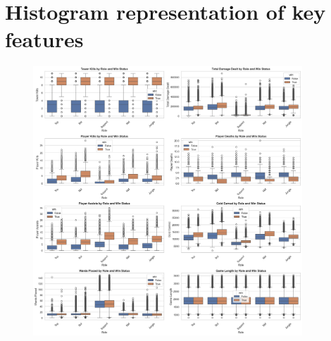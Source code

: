 \documentclass[12pt, a4paper]{article}
\begin{document}
\clearpage
\appendix
\section{Histogram representation of key features}\label{sec:features_histogram}
\begin{figure}[!ht]
    \centering
    \includegraphics[width=0.9\textwidth]{figures/0_visualization_features_histogram_by_role.png}
\end{figure}

\clearpage
\end{document}
